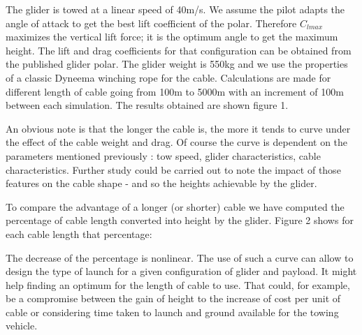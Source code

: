 \documentclass[11pt]{amsart}
\begin{document}
The glider is towed at a linear speed of 40m/s. We assume the pilot adapts the angle of attack to get the best lift coefficient of the polar. Therefore $C_{lmax}$ maximizes the vertical lift force; it is the optimum angle to get the maximum height. The lift and drag coefficients for that configuration can be obtained from the published glider polar. The glider weight is 550kg and we use the properties of a classic Dyneema winching rope for the cable. Calculations are made for different length of cable going from 100m to 5000m with an increment of 100m between each simulation.
The results obtained are shown figure 1. 

An obvious note is that the longer the cable is, the more it tends to curve under the effect of the cable weight and drag. Of course the curve is dependent on the parameters mentioned previously : tow speed, glider characteristics, cable characteristics. Further study could be carried out to note the impact of those features on the cable shape - and so the heights achievable by the glider. 

To compare the advantage of a longer (or shorter) cable we have computed the percentage of cable length converted into height by the glider. Figure 2 shows for each cable length that percentage: 


The decrease of the percentage is nonlinear. The use of such a curve can allow to design the type of launch for a given configuration of glider and payload. It might help finding an optimum for the length of cable to use. That could, for example, be a compromise between the gain of height to the increase of cost per unit of cable or considering time taken to launch and ground available for the towing vehicle. 
\end{document}
